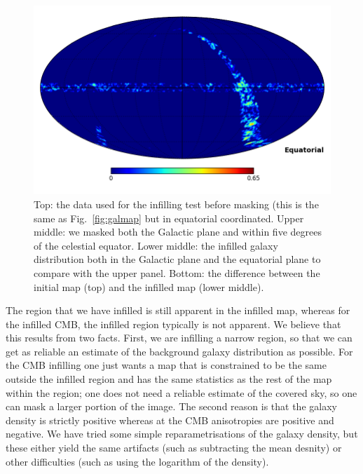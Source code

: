 \documentclass[useAMS,usenatbib]{mn2e}
\begin{document}
\begin{figure}
  \includegraphics[width=\columnwidth,clip,trim=0 0.4in 0 0]{infill_test_diffC.png}
  \caption{Top: the data used for the infilling test before masking
    (this is the same as Fig.~\ref{fig:galmap} but in equatorial
    coordinated.  Upper middle: we masked both the Galactic plane and within
    five degrees of the celestial equator.  Lower middle: the infilled galaxy
    distribution both in the Galactic plane and the equatorial plane
    to compare with the upper panel. Bottom: the difference between the initial map (top) and the
    infilled map (lower middle).}
  \label{fig:infilling_test}
\end{figure}

The region that we have infilled is still apparent in the infilled map,
whereas for the infilled CMB, the infilled region typically is not
apparent.  We believe that this results from two facts.  First, we are
infilling a narrow region, so that we can get as reliable an estimate
of the background galaxy distribution as possible. For the CMB
infilling one just wants a map that is constrained to be the same
outside the infilled region and has the same statistics as the rest of
the map within the region; one does not need a reliable estimate of
the covered sky, so one can mask a larger portion of the image.  The
second reason is that the galaxy density is strictly positive whereas
at the CMB anisotropies are positive and negative.  We have tried some
simple reparametrisations of the galaxy density, but these either
yield the same artifacts (such as subtracting the mean desnity) or
other difficulties (such as using the logarithm of the density).
\end{document}
